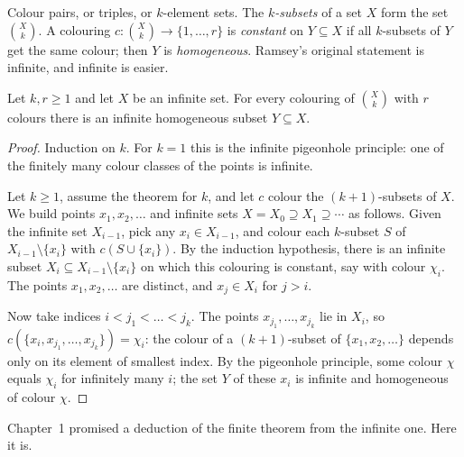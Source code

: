 Colour pairs, or triples, or $k$-element sets. The \emph{$k$-subsets} of a set $X$ form the set $\binom Xk$. A colouring $c:\binom Xk\to\{1,\dots,r\}$ is
\emph{constant} on $Y\subseteq X$ if all $k$-subsets of $Y$ get the same colour; then $Y$ is \emph{homogeneous}. Ramsey's original statement is infinite, and
infinite is easier.

\begin{theorem}[Ramsey, 1930]\label{thm:ramseyinf}
Let $k,r\ge1$ and let $X$ be an infinite set. For every colouring of $\binom Xk$ with $r$ colours there is an infinite homogeneous subset $Y\subseteq X$.
\end{theorem}
\begin{proof}
Induction on $k$. For $k=1$ this is the infinite pigeonhole principle: one of the finitely many colour classes of the points is infinite.

Let $k\ge1$, assume the theorem for $k$, and let $c$ colour the $(k+1)$-subsets of $X$. We build points $x_1,x_2,\ldots$ and infinite sets $X=X_0\supseteq X_1\supseteq\cdots$ as
follows. Given the infinite set $X_{i-1}$, pick any $x_i\in X_{i-1}$, and colour each $k$-subset $S$ of $X_{i-1}\setminus\{x_i\}$ with $c(S\cup\{x_i\})$. By the induction hypothesis,
there is an infinite subset $X_i\subseteq X_{i-1}\setminus\{x_i\}$ on which this colouring is constant, say with colour $\chi_i$. The points $x_1,x_2,\ldots$ are distinct, and
$x_j\in X_i$ for $j>i$.

Now take indices $i<j_1<\dots<j_k$. The points $x_{j_1},\dots,x_{j_k}$ lie in $X_i$, so $c(\{x_i,x_{j_1},\dots,x_{j_k}\})=\chi_i$: the colour of a $(k+1)$-subset of $\{x_1,x_2,\ldots\}$
depends only on its element of smallest index. By the pigeonhole principle, some colour $\chi$ equals $\chi_i$ for infinitely many $i$; the set $Y$ of these $x_i$ is
infinite and homogeneous of colour $\chi$.
\end{proof}

Chapter~1 promised a deduction of the finite theorem from the infinite one. Here it is.


